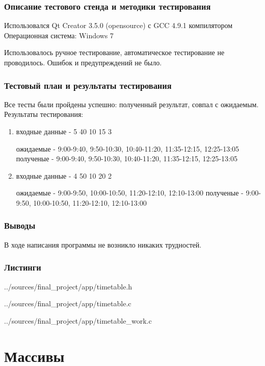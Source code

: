 \documentclass[12pt,a4paper]{report}
\begin{document}
\subsection{Описание тестового стенда и методики тестирования}

Использовался Qt Creator 3.5.0 (opensource) с GCC 4.9.1 компилятором
Операционная система: Windows 7


Использовалось ручное тестирование, автоматическое тестирование не проводилось.
Ошибок и предупреждений не было.

\subsection{Тестовый план и результаты тестирования}
Все тесты были пройдены успешно: полученный результат, совпал с ожидаемым. Результаты тестирования:

\begin{enumerate}
\item входные данные - 5 40 10 15 3

ожидаемые - 9:00-9:40, 9:50-10:30, 10:40-11:20, 11:35-12:15, 12:25-13:05
полученые - 9:00-9:40, 9:50-10:30, 10:40-11:20, 11:35-12:15, 12:25-13:05

\item входные данные - 4 50 10 20 2

ожидаемые - 9:00-9:50, 10:00-10:50, 11:20-12:10, 12:10-13:00
полученые - 9:00-9:50, 10:00-10:50, 11:20-12:10, 12:10-13:00
\end{enumerate}


\subsection{Выводы}

В ходе написания программы не возникло никаких трудностей.

\subsection*{Листинги}

{../sources/final_project/app/timetable.h}

{../sources/final_project/app/timetable.c}

{../sources/final_project/app/timetable_work.c}


\chapter{Массивы}
\end{document}
